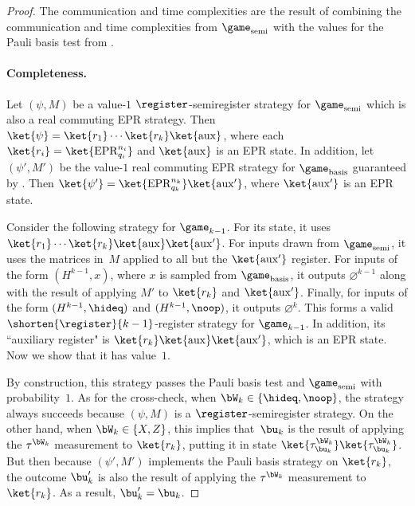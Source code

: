 \begin{proof}
The communication and time complexities are the result of combining
the communication and time complexities from $\game_{\mathrm{semi}}$ with the values for the Pauli basis test from .

\paragraph{Completeness.}
Let $(\psi, M)$ be a value-$1$ $\register$-semiregister strategy for $\game_{\mathrm{semi}}$ which is also a real commuting EPR strategy. 
Then $\ket{\psi} = \ket{r_1} \cdots \ket{r_k} \ket{\mathrm{aux}}$, where each $\ket{r_i} = \ket{\mathrm{EPR}_{q_i}^{n_i}}$ and $\ket{\mathrm{aux}}$ is an EPR state.
In addition, let $(\psi', M')$ be the value-$1$ real commuting EPR strategy for $\game_{\mathrm{basis}}$ guaranteed by .
Then $\ket{\psi'} = \ket{\mathrm{EPR}_{q_k}^{n_k}} \ket{\mathrm{aux}'}$, where $\ket{\mathrm{aux}'}$ is an EPR state.

Consider the following strategy for $\game_{k-1}$.
For its state, it uses $\ket{r_1}\cdots \ket{r_k}\ket{\mathrm{aux}}\ket{\mathrm{aux}'}$.
For inputs drawn from $\game_{\mathrm{semi}}$, it uses the matrices in~$M$ applied to all but the $\ket{\mathrm{aux}'}$ register.
For inputs of the form $(H^{k-1}, x)$, where $x$ is sampled from $\game_{\mathrm{basis}}$, it outputs $\varnothing^{k-1}$ along with the result of applying $M'$ to $\ket{r_k}$ and $\ket{\mathrm{aux}'}$.
Finally, for inputs of the form $(H^{k-1}, \hideq)$ and $(H^{k-1}, \noop)$, it outputs $\varnothing^k$.
This forms a valid $\shorten{\register}{k-1}$-register strategy for $\game_{k-1}$.
In addition, its ``auxiliary register" is $\ket{r_k} \ket{\mathrm{aux}}\ket{\mathrm{aux}'}$, which is an EPR state.
Now we show that it has value~$1$.

By construction, this strategy passes the Pauli basis test and $\game_{\mathrm{semi}}$ with probability~$1$.
As for the cross-check, when $\bW_k \in \{\hideq, \noop\}$, the strategy always succeeds because $(\psi, M)$ is a $\register$-semiregister strategy.
On the other hand, when $\bW_k \in \{X, Z\}$, this implies that~$\bu_k$ is the result of applying the $\tau^{\bW_k}$ measurement to $\ket{r_k}$,
putting it in state $\ket{\tau^{\bW_k}_{\bu_k}}\ket{\tau^{\bW_k}_{\bu_k}}$.
But then because $(\psi', M')$ implements the Pauli basis strategy on $\ket{r_k}$, the outcome $\bu_k'$ is also the result of applying the $\tau^{\bW_k}$ measurement to $\ket{r_k}$.
As a result, $\bu_k' = \bu_k$.


\end{proof}
